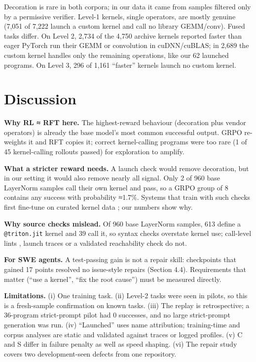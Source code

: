 \documentclass[11pt]{article}
\begin{document}
Decoration is rare in both corpora; in our data it came from samples filtered only by
a permissive verifier. Level-1 kernels, single operators, are mostly genuine (7,051 of
7,222 launch a custom kernel and call no library GEMM/conv). Fused tasks differ. On
Level 2, 2,734 of the 4,750 archive kernels reported faster than eager PyTorch run
their GEMM or convolution in cuDNN/cuBLAS; in 2,689 the custom kernel handles only the
remaining operations, like our 62 launched programs. On Level 3, 296 of 1,161 ``faster''
kernels launch no custom kernel.

\section{Discussion}\label{discussion}

\textbf{Why RL ≈ RFT here.} The highest-reward behaviour (decoration plus vendor
operators) is already the base model's most common successful output.
GRPO re-weights it and RFT copies it; correct kernel-calling programs were too rare
(1 of 45 kernel-calling rollouts passed) for exploration to amplify.

\textbf{What a stricter reward needs.} A launch check \cite{r15} would remove decoration, but
in our setting it would also remove nearly all signal. Only 2 of 960 base LayerNorm
samples call their own kernel and pass, so a GRPO group of 8 contains any success
with probability ≈1.7\%. Systems that train with such checks first fine-tune on
curated kernel data \cite{r13,r14,r15}; our numbers show why.

\textbf{Why source checks mislead.} Of 960 base LayerNorm samples, 613 define a
\texttt{@triton.\allowbreak{}jit} kernel and 39 call it, so syntax checks \cite{r13} overstate kernel use;
call-level lints \cite{r14}, launch traces \cite{r15} or a validated reachability check do not.

\textbf{For SWE agents.} A test-passing gain is not a repair skill: checkpoints that gained
17 points resolved no issue-style repairs (Section 4.4). Requirements that matter
(``use a kernel'', ``fix the root cause'') must be measured directly.

\textbf{Limitations.} (i) One training task. (ii) Level-2 tasks were seen in pilots, so this
is a fresh-sample confirmation on known tasks. (iii) The replay is retrospective; a
36-program strict-prompt pilot had 0 successes, and no large strict-prompt generation
was run. (iv) ``Launched'' uses name attribution; training-time and corpus analyses are
static and validated against traces or logged profiles.
(v) C and S differ in failure penalty as well as speed shaping. (vi) The repair study
covers two development-seen defects from one repository.
\end{document}
